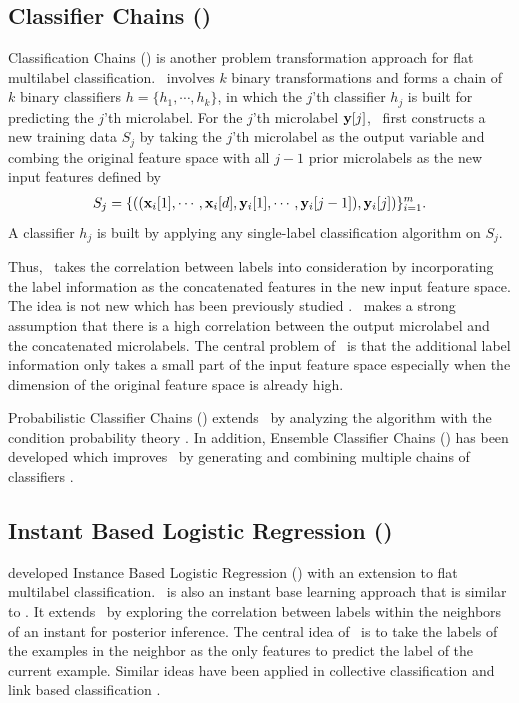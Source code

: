 {\subsection{Classifier Chains (\cc)}

Classification Chains (\cc) \citep{Read09classifier,Read11classifier} is another problem transformation approach for flat multilabel classification.
\cc\ involves $k$ binary transformations and forms a chain of $k$ binary classifiers $h=\{h_1,\cdots,h_k\}$, in which the $j$'th classifier $h_j$ is built for predicting the $j$'th microlabel.
For the $j$'th microlabel $\mathbf {y}[j]$, \cc\ first constructs a new training data $S_j$ by taking the $j$'th microlabel as the output variable and combing the original feature space with all $j-1$ prior microlabels as the new input features defined by
\begin{align*}
	S_j = \{((\mathbf {x}_i[1],\cdots,\mathbf {x}_i[d],\mathbf {y}_i[1],\cdots,\mathbf {y}_i[j-1]),\mathbf {y}_i[j])\}_{i=1}^{m}.
\end{align*}
A classifier $h_j$ is built by applying any single-label classification algorithm on $S_j$.

Thus, \cc\ takes the correlation between labels into consideration by incorporating the label information as the concatenated features in the new input feature space.
The idea is not new which has been previously studied \citep{Godbole04discriminative}.
\cc\ makes a strong assumption that there is a high correlation between the output microlabel and the concatenated microlabels.
The central problem of \cc\ is that the additional label information only takes a small part of the input feature space especially when the dimension of the original feature space is already high.

Probabilistic Classifier Chains (\pcc) extends \cc\ by analyzing the algorithm with the condition probability theory \citep{Read09classifier,Dembczynski10bayes}.
In addition, Ensemble Classifier Chains (\ecc) has been developed which improves \cc\ by generating and combining multiple chains of classifiers \citep{Read11classifier}. 



%
%
\subsection{Instant Based Logistic Regression (\iblr)} \label{sc_iblr}

\citet{Cheng09combining} developed Instance Based Logistic Regression (\iblr) with an extension to flat multilabel classification.
\iblr\ is also an instant base learning approach \citep{Aha91instance} that is similar to \mlknn.
It extends \mlknn\ by exploring the correlation between labels within the neighbors of an instant for posterior inference.
The central idea of \iblr\ is to take the labels of the examples in the neighbor as the only features to predict the label of the current example.
Similar ideas have been applied in collective classification \citep{Ghamrawi05collective} and link based classification \citep{Getoor05link, Getoor07introduction}.

}

